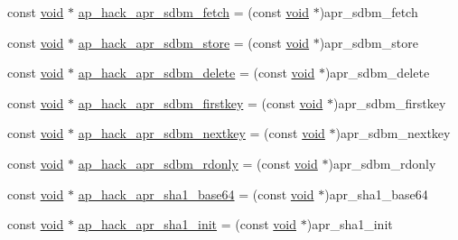 \begin{DoxyCompactItemize}
const \hyperlink{group__MOD__ISAPI_gacd6cdbf73df3d9eed42fa493d9b621a6}{void} $\ast$ \hyperlink{srclib_2apr-util_2exports_8c_af07c4728226416c50533957af08195d7}{ap\+\_\+hack\+\_\+apr\+\_\+sdbm\+\_\+fetch} = (const \hyperlink{group__MOD__ISAPI_gacd6cdbf73df3d9eed42fa493d9b621a6}{void} $\ast$)apr\+\_\+sdbm\+\_\+fetch
\item 
const \hyperlink{group__MOD__ISAPI_gacd6cdbf73df3d9eed42fa493d9b621a6}{void} $\ast$ \hyperlink{srclib_2apr-util_2exports_8c_a49ea5a4f8f1c134db24e0407927aa86e}{ap\+\_\+hack\+\_\+apr\+\_\+sdbm\+\_\+store} = (const \hyperlink{group__MOD__ISAPI_gacd6cdbf73df3d9eed42fa493d9b621a6}{void} $\ast$)apr\+\_\+sdbm\+\_\+store
\item 
const \hyperlink{group__MOD__ISAPI_gacd6cdbf73df3d9eed42fa493d9b621a6}{void} $\ast$ \hyperlink{srclib_2apr-util_2exports_8c_a926ed3904dae25ef866c9d6166ce7796}{ap\+\_\+hack\+\_\+apr\+\_\+sdbm\+\_\+delete} = (const \hyperlink{group__MOD__ISAPI_gacd6cdbf73df3d9eed42fa493d9b621a6}{void} $\ast$)apr\+\_\+sdbm\+\_\+delete
\item 
const \hyperlink{group__MOD__ISAPI_gacd6cdbf73df3d9eed42fa493d9b621a6}{void} $\ast$ \hyperlink{srclib_2apr-util_2exports_8c_ace803ef8915eb102367e51ff8e8d6e7d}{ap\+\_\+hack\+\_\+apr\+\_\+sdbm\+\_\+firstkey} = (const \hyperlink{group__MOD__ISAPI_gacd6cdbf73df3d9eed42fa493d9b621a6}{void} $\ast$)apr\+\_\+sdbm\+\_\+firstkey
\item 
const \hyperlink{group__MOD__ISAPI_gacd6cdbf73df3d9eed42fa493d9b621a6}{void} $\ast$ \hyperlink{srclib_2apr-util_2exports_8c_afab3bb42a4fd56b0d290d3b01573cca4}{ap\+\_\+hack\+\_\+apr\+\_\+sdbm\+\_\+nextkey} = (const \hyperlink{group__MOD__ISAPI_gacd6cdbf73df3d9eed42fa493d9b621a6}{void} $\ast$)apr\+\_\+sdbm\+\_\+nextkey
\item 
const \hyperlink{group__MOD__ISAPI_gacd6cdbf73df3d9eed42fa493d9b621a6}{void} $\ast$ \hyperlink{srclib_2apr-util_2exports_8c_ab8162d640442d354a65ec842a0a439e7}{ap\+\_\+hack\+\_\+apr\+\_\+sdbm\+\_\+rdonly} = (const \hyperlink{group__MOD__ISAPI_gacd6cdbf73df3d9eed42fa493d9b621a6}{void} $\ast$)apr\+\_\+sdbm\+\_\+rdonly
\item 
const \hyperlink{group__MOD__ISAPI_gacd6cdbf73df3d9eed42fa493d9b621a6}{void} $\ast$ \hyperlink{srclib_2apr-util_2exports_8c_a2459150b1d39b4a4b61f03ed9c69c51d}{ap\+\_\+hack\+\_\+apr\+\_\+sha1\+\_\+base64} = (const \hyperlink{group__MOD__ISAPI_gacd6cdbf73df3d9eed42fa493d9b621a6}{void} $\ast$)apr\+\_\+sha1\+\_\+base64
\item 
const \hyperlink{group__MOD__ISAPI_gacd6cdbf73df3d9eed42fa493d9b621a6}{void} $\ast$ \hyperlink{srclib_2apr-util_2exports_8c_aadc54c51114302dc6548e55ee123165e}{ap\+\_\+hack\+\_\+apr\+\_\+sha1\+\_\+init} = (const \hyperlink{group__MOD__ISAPI_gacd6cdbf73df3d9eed42fa493d9b621a6}{void} $\ast$)apr\+\_\+sha1\+\_\+init

\end{DoxyCompactItemize}
